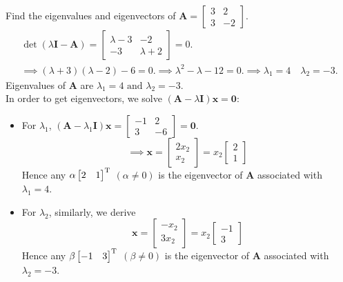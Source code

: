 \begin{example}
Find the eigenvalues and eigenvectors of $\bm A=\begin{bmatrix}
3&2\\3&-2
\end{bmatrix}$.\\
\begin{gather*}
\det(\lambda\bm I-\bm A)=\begin{bmatrix}
\lambda -3&-2\\-3&\lambda+2
\end{bmatrix}=0.\\
\implies (\lambda+3)(\lambda-2)-6=0.
\implies \lambda^2-\lambda-12=0.\implies
\lambda_1=4\quad\lambda_2=-3.
\end{gather*}
Eigenvalues of $\bm A$ are $\lambda_1=4\text{ and }\lambda_2=-3.$\\
In order to get eigenvectors, we solve $(\bm A-\lambda\bm I)\bm x=\bm 0$:
\begin{itemize}
\item
For $\lambda_1$, $(\bm A-\lambda_1\bm I)\bm x=\begin{bmatrix}
-1&2\\3&-6
\end{bmatrix}=\bm 0$.
\[
\implies \bm x=\begin{bmatrix}
2x_2\\x_2
\end{bmatrix}=x_2\begin{bmatrix}
2\\1
\end{bmatrix}
\]
Hence any $\alpha\begin{bmatrix}
2&1
\end{bmatrix}^{\mathrm T}$ $(\alpha\ne0)$ is the eigenvector of $\bm A$ associated with $\lambda_1=4.$
\item
For $\lambda_2$, similarly, we derive
\[
\bm x=\begin{bmatrix}
-x_2\\3x_2
\end{bmatrix}=x_2\begin{bmatrix}
-1\\3
\end{bmatrix}
\]
Hence any $\beta\begin{bmatrix}
-1&3
\end{bmatrix}^{\mathrm T}$ $(\beta\ne0)$ is the eigenvector of $\bm A$ associated with $\lambda_2=-3.$
\end{itemize}
\end{example}
